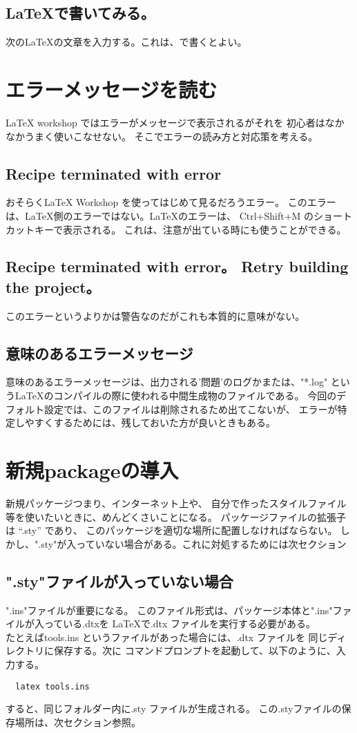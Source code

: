 \documentclass{ltjsarticle}
\begin{document}
\subsection{\LaTeX で書いてみる。}
次の\LaTeX の文章を入力する。これは、\LuaLaTeX で書くとよい。


\section{エラーメッセージを読む}
LaTeX workshop ではエラーがメッセージで表示されるがそれを
初心者はなかなかうまく使いこなせない。
そこでエラーの読み方と対応策を考える。
\subsection{Recipe terminated with error}
おそらくLaTeX Workshop を使ってはじめて見るだろうエラー。
このエラーは、\LaTeX 側のエラーではない。\LaTeX のエラーは、
Ctrl+Shift+M のショートカットキーで表示される。
これは、注意が出ている時にも使うことができる。
\subsection{Recipe terminated with error。 Retry building the project。}
このエラーというよりかは警告なのだがこれも本質的に意味がない。
\subsection{意味のあるエラーメッセージ}
意味のあるエラーメッセージは、出力される'問題'のログかまたは、"*.log"
という\LaTeX のコンパイルの際に使われる中間生成物のファイルである。
今回のデフォルト設定では、このファイルは削除されるため出てこないが、
エラーが特定しやすくするためには、残しておいた方が良いときもある。

\section{新規packageの導入}
新規パッケージつまり、インターネット上や、
自分で作ったスタイルファイル等を使いたいときに、めんどくさいことになる。
パッケージファイルの拡張子は “.sty” であり、
このパッケージを適切な場所に配置しなければならない。
しかし、".sty"が入っていない場合がある。これに対処するためには次セクション
\subsection{".sty"ファイルが入っていない場合}
".ins"ファイルが重要になる。
このファイル形式は、パッケージ本体と".ins"ファイルが入っている.dtxを
\LaTeX で.dtx ファイルを実行する必要がある。\\
たとえばtools.ins というファイルがあった場合には、.dtx ファイルを
同じディレクトリに保存する。次に
コマンドプロンプトを起動して、以下のように、入力する。
\begin{verbatim}
  latex tools.ins
\end{verbatim}
すると、同じフォルダー内に.sty ファイルが生成される。
この.styファイルの保存場所は、次セクション参照。
\end{document}
